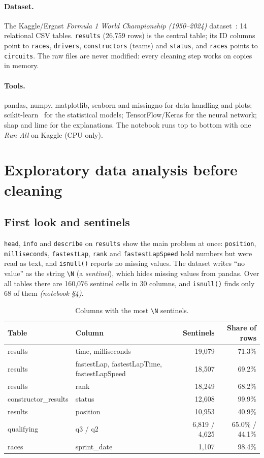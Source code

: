 \documentclass[11pt,a4paper]{article}
\newcommand{\code}[1]{\texttt{#1}}
\newcommand{\nb}[1]{\textit{(notebook \S#1)}}
\begin{document}
\paragraph{Dataset.} The Kaggle/Ergast \textit{Formula 1 World Championship (1950--2024)} dataset~\cite{f1dataset}: 14 relational CSV tables. \code{results} (26{,}759 rows) is the central table; its ID columns point to \code{races}, \code{drivers}, \code{constructors} (teams) and \code{status}, and \code{races} points to \code{circuits}. The raw files are never modified: every cleaning step works on copies in memory.

\paragraph{Tools.} pandas, numpy, matplotlib, seaborn and missingno for data handling and plots; scikit-learn~\cite{sklearn} for the statistical models; TensorFlow/Keras for the neural network; shap and lime for the explanations. The notebook runs top to bottom with one \textit{Run All} on Kaggle (CPU only).

\section{Exploratory data analysis before cleaning}

\subsection{First look and sentinels}
\code{head}, \code{info} and \code{describe} on \code{results} show the main problem at once: \code{position}, \code{milliseconds}, \code{fastestLap}, \code{rank} and \code{fastestLapSpeed} hold numbers but were read as text, and \code{isnull()} reports no missing values. The dataset writes ``no value'' as the string \verb|\N| (a \emph{sentinel}), which hides missing values from pandas. Over all tables there are 160{,}076 sentinel cells in 30 columns, and \code{isnull()} finds only 68 of them \nb{4}.

\begin{table}[H]
\centering\small
\caption{Columns with the most \texttt{\textbackslash N} sentinels.}
\label{tab:sentinels}
\begin{tabular}{llrr}
\toprule
Table & Column & Sentinels & Share of rows \\
\midrule
results & time, milliseconds & 19{,}079 & 71.3\% \\
results & fastestLap, fastestLapTime, fastestLapSpeed & 18{,}507 & 69.2\% \\
results & rank & 18{,}249 & 68.2\% \\
constructor\_results & status & 12{,}608 & 99.9\% \\
results & position & 10{,}953 & 40.9\% \\
qualifying & q3 / q2 & 6{,}819 / 4{,}625 & 65.0\% / 44.1\% \\
races & sprint\_date & 1{,}107 & 98.4\% \\
\bottomrule
\end{tabular}
\end{table}
\end{document}
